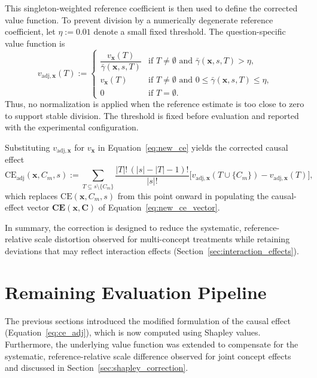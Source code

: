 This singleton-weighted reference coefficient is then used to define the corrected value function. To prevent division by a numerically degenerate reference coefficient, let $\eta:=0.01$ denote a small fixed threshold. The question-specific value function is
\begin{equation}
	\label{eq:v_adj}
	v_{\mathrm{adj},\mathbf{x}}(T) :=
	\begin{cases}
		\dfrac{v_{\mathbf{x}}(T)}{\bar\gamma(\mathbf{x},s,T)} & \text{if }T\neq\emptyset\text{ and }\bar\gamma(\mathbf{x},s,T)>\eta,         \\
		v_{\mathbf{x}}(T)                                     & \text{if }T\neq\emptyset\text{ and }0\leq\bar\gamma(\mathbf{x},s,T)\leq\eta, \\
		0                                                     & \text{if }T=\emptyset.
	\end{cases}
\end{equation}
Thus, no normalization is applied when the reference estimate is too close to zero to support stable division. The threshold is fixed before evaluation and reported with the experimental configuration.

Substituting $v_{\mathrm{adj},\mathbf{x}}$ for $v_{\mathbf{x}}$ in Equation~\ref{eq:new_ce} yields the corrected causal effect
\begin{equation}
	\label{eq:ce_adj}
	\mathrm{CE}_{\mathrm{adj}}(\mathbf{x},C_m,s) := \sum_{T\subseteq s\setminus\{C_m\}} \frac{|T|!\,(|s|-|T|-1)!}{|s|!} \big[v_{\mathrm{adj},\mathbf{x}}(T\cup\{C_m\}) - v_{\mathrm{adj},\mathbf{x}}(T)\big],
\end{equation}
which replaces $\mathrm{CE}(\mathbf{x},C_m,s)$ from this point onward in populating the causal-effect vector $\mathbf{CE}(\mathbf{x},\mathbf{C})$ of Equation~\ref{eq:new_ce_vector}.

In summary, the correction is designed to reduce the systematic, reference-relative scale distortion observed for multi-concept treatments while retaining deviations that may reflect interaction effects (Section~\ref{sec:interaction_effects}).

\section{Remaining Evaluation Pipeline}
\label{sec:remaining_pipeline}
The previous sections introduced the modified formulation of the causal effect (Equation~\ref{eq:ce_adj}), which is now computed using Shapley values. Furthermore, the underlying value function was extended to compensate for the systematic, reference-relative scale difference observed for joint concept effects and discussed in Section~\ref{sec:shapley_correction}.

